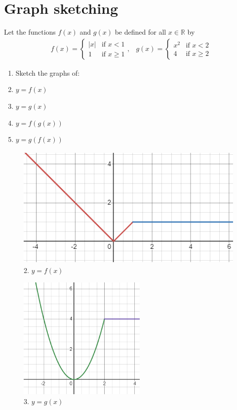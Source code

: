 \documentclass[12pt]{article}
\begin{document}
\section{Graph sketching}
Let the functions $f(x)$ and $g(x)$ be defined for all $x \in \mathbb{R}$ by 
\begin{align*}
    &f(x) = \begin{cases}
    |x| & \text{if } x < 1 \\
    1 & \text{if } x \geq 1
\end{cases}, &  
g(x) = \begin{cases}
    x^2 & \text{if } x<2 \\
    4 & \text{if } x \geq 2
\end{cases}
\end{align*} 
\begin{enumerate}
    \item Sketch the graphs of:
    \item $y=f(x)$
    \item $y = g(x)$
    \item $y = f(g(x))$
    \item $y = g(f(x))$
\end{enumerate}
 
\begin{figure}[h!]
\centering
\includegraphics[height=6cm]{2.png}
\captionsetup{labelformat=empty}
\caption{2. $y = f(x)$}
\end{figure}


\begin{figure}[h!]
\centering
\includegraphics[height=6cm]{3.png}
\captionsetup{labelformat=empty}
\caption{3. $y = g(x)$}
\end{figure}
\end{document}
